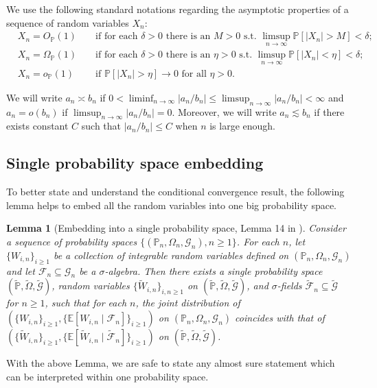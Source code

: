 \documentclass[12pt]{article}
\newtheorem{lemma}{Lemma}
\theoremstyle{definition}
\def\P{\mathbb{P}}
\def\P{\mathbb{P}}
\newcommand{\E}{\mathbb E}								%
\renewcommand{\P}{\mathbb{P}}							%
\begin{document}
We use the following standard notations regarding the asymptotic properties of a sequence of random variables $X_n$:
\begin{align*}
	&X_n = O_{\P}(1) &&\text{ if for each } \delta > 0 \text{ there is an } M > 0 \text{ s.t. } \limsup_{n \rightarrow \infty}\P[|X_n| > M] < \delta; \\
	&X_n = \Omega_{\P}(1) &&\text{ if for each } \delta > 0 \text{ there is an } \eta > 0 \text{ s.t. } \limsup_{n \rightarrow \infty}\P[|X_n| < \eta] < \delta;\\
	&X_n = o_{\P}(1) &&\text{ if } \P[|X_n| > \eta] \rightarrow 0 \text{ for all } \eta > 0.
\end{align*}

We will write $a_n \asymp b_n$ if $0<\liminf_{n\rightarrow\infty}|a_n/b_n|\leq\limsup_{n\rightarrow\infty}|a_n/b_n|<\infty$ and $a_n=o(b_n)$ if $\limsup_{n\rightarrow\infty}|a_n/b_n|=0$. Moreover, we will write $a_n\lesssim b_n$ if there exists constant $C$ such that $|a_n/b_n|\leq C$ when $n$ is large enough.


\subsection{Single probability space embedding}
To better state and understand the conditional convergence result, the following lemma helps to embed all the random variables into one big probability space.

\begin{lemma}[Embedding into a single probability space, Lemma 14 in \cite{Niu2022a}]\label{lem:embedding}
	Consider a sequence of probability spaces $\{(\P_n,\Omega_n,\mathcal{G}_n),n \geq 1\}$. For each $n$, let $\{W_{i,n}\}_{i \geq 1}$ be a collection of integrable random variables defined on $(\P_n,\Omega_n,\mathcal{G}_n)$ and let $\mathcal F_n \subseteq \mathcal G_n$ be a $\sigma$-algebra. Then there exists a single probability space $(\widetilde{\P}, \widetilde{\Omega}, \widetilde{\mathcal G})$, random variables $\{\widetilde W_{i,n}\}_{i,n \geq 1}$ on $(\widetilde{\P}, \widetilde{\Omega}, \widetilde{\mathcal G})$, and $\sigma$-fields $\widetilde{\mathcal F}_n \subseteq \widetilde{\mathcal G}$ for $n \geq 1$, such that for each $n$, the joint distribution of $(\{W_{i,n}\}_{i \geq 1}, \{\E[W_{i,n}\mid\mathcal F_n]\}_{i \geq 1})$ on $(\P_n,\Omega_n,\mathcal{G}_n)$ coincides with that of $(\{\widetilde W_{i,n}\}_{i \geq 1}, \{\E[\widetilde W_{i,n}\mid \widetilde{\mathcal F}_n]\}_{i \geq 1})$ on $(\widetilde{\P}, \widetilde{\Omega}, \widetilde{\mathcal G})$.
\end{lemma}
\noindent With the above Lemma, we are safe to state any almost sure statement which can be interpreted within one probability space. 
\end{document}
